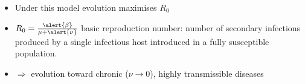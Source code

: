 \documentclass{beamer}
\begin{document}
\begin{frame}
  \pause
  \begin{block}{} %
    \begin{itemize}
    \item Under this model evolution maximises $R_0$
      \pause
    \item $R_0=\frac{\alert{\beta}}{\mu + \alert{\nu}}$ basic
      reproduction number: number of secondary infections produced by
      a single infectious host introduced in a fully susceptible
      population. \pause
    \item $\Rightarrow$ evolution toward \alert{chronic} ($\nu \to
      0$), highly transmissible diseases
    \end{itemize}
  \end{block}

\end{frame}
\end{document}
